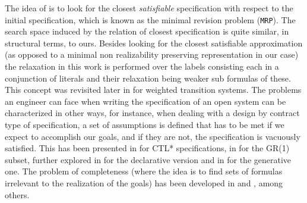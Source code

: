 The idea of \cite{DBLP:conf/icra/KimFS12} is to look for the closest \textit{satisfiable} specification with respect to the initial specification, which is known as the minimal revision problem (\texttt{MRP}).  The search space induced by the relation of closest specification is quite similar, in structural terms, to ours. Besides looking for the closest satisfiable approximation (as opposed to a minimal non realizability preserving representation in our case) the relaxation in this work is performed over the labels consisting each in a conjunction of literals and their relaxation being weaker sub formulas of these.  This concept was revisited later in \cite{DBLP:conf/icra/KimF13} for weighted transition systems.
The problems an engineer can face when writing the specification
of an open system can be characterized in other ways, for instance, 
when dealing with a design by contract type of specification, a set of assumptions is defined that has to be met
if we expect to accomplish our goals, and
if they are not, the specification is vacuously satisfied.
This has been presented in \cite{kupferman2003vacuity}
for CTL* specifications, in \cite{DBLP:conf/hvc/KleinP10} for the
GR(1)\cite{DBLP:conf/vmcai/PitermanPS06} subset, further explored in \cite{DBLP:conf/sigsoft/MaozR16}
for the declarative version and in \cite{DBLP:phd/ethos/DIppolito13}
for the generative one.  
The problem of completeness (where the idea is to find sets of formulas
irrelevant to the realization of the goals) has been
developed in \cite{chockler2001practical} and \cite{chockler2001coverage},
among others.

